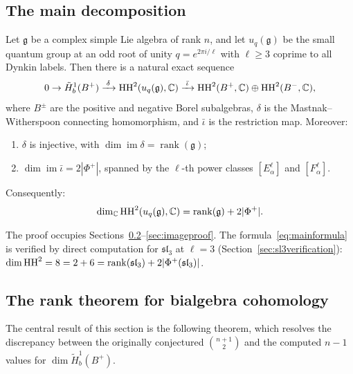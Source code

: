 \subsection{The main decomposition}

\begin{theorem}
\label{thm:maindecomp}
Let $\mathfrak{g}$ be a complex simple Lie algebra of rank $n$, and let $u_q(\mathfrak{g})$ be the small quantum group at an odd root of unity $q = e^{2\pi i/\ell}$ with $\ell \geq 3$ coprime to all Dynkin labels. Then there is a natural exact sequence
\begin{equation}
\label{eq:maindecomp}
0 \to \tilde{H}^1_b(B^+) \xrightarrow{\;\delta\;} \operatorname{HH}^2(u_q(\mathfrak{g}), \mathbb{C}) \xrightarrow{\;\bar\iota\;} \operatorname{HH}^2(B^+, \mathbb{C}) \oplus \operatorname{HH}^2(B^-, \mathbb{C}),
\end{equation}
where $B^\pm$ are the positive and negative Borel subalgebras, $\delta$ is the Mastnak--Witherspoon connecting homomorphism, and $\bar\iota$ is the restriction map. Moreover:
\begin{enumerate}[label=(\roman*)]
\item $\delta$ is injective, with $\dim \operatorname{im} \delta = \operatorname{rank}(\mathfrak{g})$;
\item $\dim \operatorname{im} \bar\iota = 2|\Phi^+|$, spanned by the $\ell$-th power classes $[E_\alpha^\ell]$ and $[F_\alpha^\ell]$.
\end{enumerate}
Consequently:
\begin{equation}
\label{eq:mainformula}
\dim_{\mathbb{C}} \operatorname{HH}^2(u_q(\mathfrak{g}), \mathbb{C}) = \operatorname{rank}(\mathfrak{g}) + 2|\Phi^+|.
\end{equation}
\end{theorem}

The proof occupies Sections~\ref{sec:rankproof}--\ref{sec:imageproof}. The formula~\eqref{eq:mainformula} is verified by direct computation for $\mathfrak{sl}_3$ at $\ell = 3$ (Section~\ref{sec:sl3verification}): $\dim \operatorname{HH}^2 = 8 = 2 + 6 = \operatorname{rank}(\mathfrak{sl}_3) + 2|\Phi^+(\mathfrak{sl}_3)|$.

\figDecomposition

\figRootAtwo

\subsection{The rank theorem for bialgebra cohomology}
\label{sec:rankproof}

The central result of this section is the following theorem, which resolves the discrepancy between the originally conjectured $\binom{n+1}{2}$ and the computed $n-1$ values for $\dim \tilde{H}^1_b(B^+)$.

